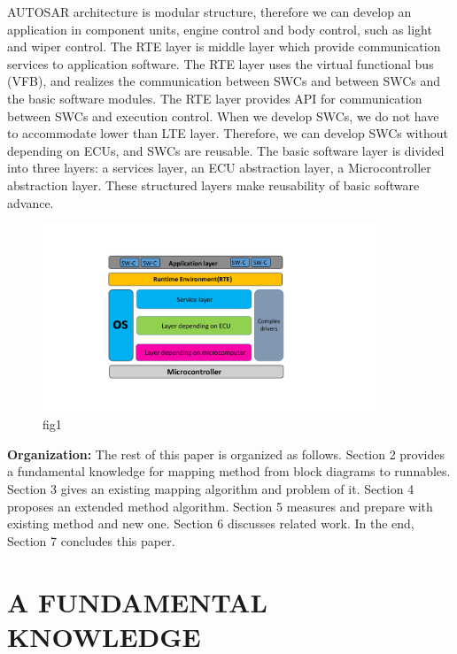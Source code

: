\documentclass[conference,compsoc]{IEEEtran}
\begin{document}
AUTOSAR architecture is modular structure, therefore we can develop an application in component units, engine control and body control, such as light and wiper control.
 The RTE layer is middle layer which provide communication services to application software.
The RTE layer uses the virtual functional bus (VFB), and realizes the communication between SWCs and between  SWCs and the basic software modules.
The RTE layer provides API for communication between SWCs and execution control.
When we develop SWCs, we do not have to accommodate lower than LTE layer.
Therefore, we can develop SWCs without depending on ECUs, and SWCs are reusable.
 The basic software layer is divided into three layers: a services layer, an ECU abstraction layer, a Microcontroller abstraction layer.
These structured layers make reusability of basic software advance. 

\begin{figure}
	\centering
	\includegraphics[width=10cm,clip]{figure3.pdf}
	\caption{fig1}
	\label{fig1}
\end{figure}

 {\bf Organization:} The rest of this paper is organized as follows.
Section 2 provides a fundamental knowledge for mapping method from block diagrams to runnables.
Section 3 gives an existing mapping algorithm and problem of it.
Section 4 proposes an extended method algorithm.
Section 5 measures and prepare with existing method and new one.
Section 6 discusses related work.
In the end, Section 7 concludes this paper.   
\section {A FUNDAMENTAL KNOWLEDGE}
\end{document}
